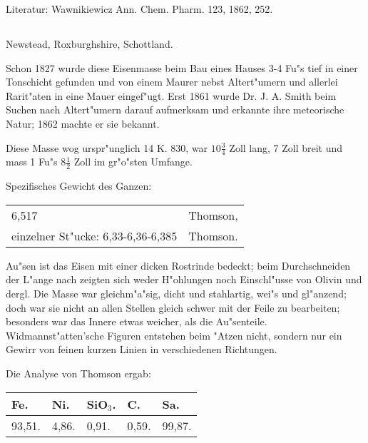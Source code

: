 \documentclass[a4paper, 11pt, oneside]{article}
\begin{document}
\normalsize
Literatur: Wawnikiewicz Ann. Chem. Pharm. 123, 1862, 252.

\subsection{}
\LARGE
\paragraph{}
Newstead, Roxburghshire, Schottland.

Schon 1827 wurde diese Eisenmasse beim Bau eines Hauses 3-4 Fu"s tief in einer Tonschicht gefunden und von einem Maurer nebst Altert"umern und allerlei Rarit"aten in eine Mauer eingef"ugt. Erst 1861 wurde Dr. J. A. Smith beim Suchen nach Altert"umern darauf aufmerksam und erkannte ihre meteorische Natur; 1862 machte er sie bekannt.

Diese Masse wog urspr"unglich 14 K. 830, war $\mathfrak{10\frac{3}{4}}$ Zoll lang, 7 Zoll breit und mass 1 Fu"s $\mathfrak{8\frac{1}{2}}$ Zoll im gr"o"sten Umfange.

Spezifisches Gewicht des Ganzen:
\begin{table}[!ht]
    \centering\swabfamily\Large
    \begin{tabular}{l l}
        6,517 & Thomson,\\
        einzelner St"ucke: 6,33-6,36-6,385 & Thomson.
    \end{tabular}
\end{table}

Au"sen ist das Eisen mit einer dicken Rostrinde bedeckt; beim Durchschneiden der L"ange nach zeigten sich weder H"ohlungen noch Einschl"usse von Olivin und dergl. Die Masse war gleichm"a"sig, dicht und stahlartig, wei"s und gl"anzend; doch war sie nicht an allen Stellen gleich schwer mit der Feile zu bearbeiten; besonders war das Innere etwas weicher, als die Au"senteile. Widmannst"atten'sche Figuren entstehen beim "Atzen nicht, sondern nur ein Gewirr von feinen kurzen Linien in verschiedenen Richtungen.

Die Analyse von Thomson ergab:
\begin{table}[H]
    \centering\swabfamily\Large
    \begin{tabular}{l l l l l}
        Fe. & Ni. & SiO$_{3}$. & C. & Sa. \\ \hline
        93,51. & 4,86. & 0,91. & 0,59. & 99,87. \\
    \end{tabular}
\end{table}
\end{document}
